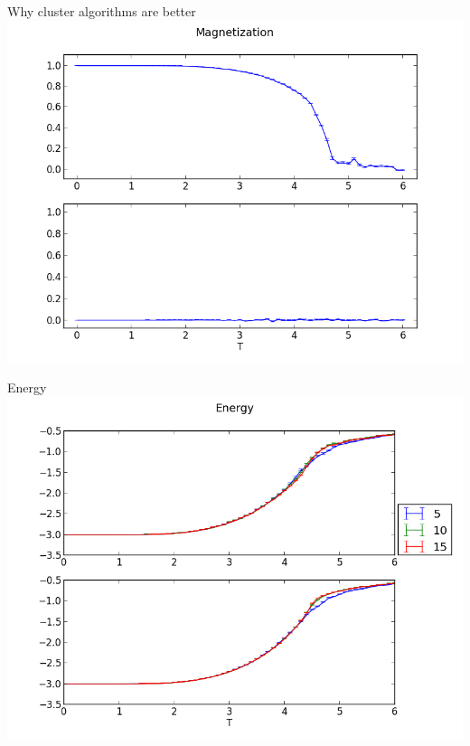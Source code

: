 \documentclass[handout]{beamer}
\begin{document}
\begin{frame}{Why cluster algorithms are better}
\includegraphics[width=\textwidth]{img/comp_magnetization.png}
\note{ }
\end{frame}

\begin{frame}{Energy}
\includegraphics[width=\textwidth]{../results/measurements/energy.png}
\note{ }
\end{frame}
\end{document}
